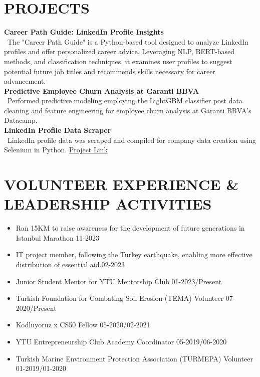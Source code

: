 \documentclass[letterpaper,9pt]{extarticle} %
\begin{document}
\section*{PROJECTS}
\noindent
\textbf{Career Path Guide: LinkedIn Profile Insights} \\
\ The "Career Path Guide" is a Python-based tool designed to analyze LinkedIn profiles and offer personalized career advice. Leveraging NLP, BERT-based methods, and classification techniques, it examines user profiles to suggest potential future job titles and recommends skills necessary for career advancement.\\

\noindent
\textbf{Predictive Employee Churn Analysis at Garanti BBVA} \\
\ Performed predictive modeling employing the LightGBM classifier post data cleaning and feature engineering for employee churn analysis at Garanti BBVA's Datacamp.\\

\noindent
\textbf{LinkedIn Profile Data Scraper} \\
\ LinkedIn profile data was scraped and compiled for company data creation using Selenium in Python.
\href{https://github.com/eslemguler/Linkedin-Profile-Scraper}{Project Link}

\section*{VOLUNTEER EXPERIENCE \& LEADERSHIP ACTIVITIES}
\begin{itemize}
    \item Ran 15KM to raise awareness for the development of future generations in Istanbul Marathon \hfill 11-2023
    \item IT project member, following the Turkey earthquake, enabling more effective distribution of essential aid.\hfill 02-2023
    \item Junior Student Mentor for YTU Mentorship Club \hfill 01-2023/Present
    \item Turkish Foundation for Combating Soil Erosion (TEMA) Volunteer \hfill 07-2020/Present
    \item Kodluyoruz x CS50 Fellow \hfill 05-2020/02-2021
    \item YTU Entrepreneurship Club Academy Coordinator \hfill 05-2019/06-2020
    \item Turkish Marine Environment Protection Association (TURMEPA) Volunteer \hfill 01-2019/01-2020
\end{itemize}


\end{document}
